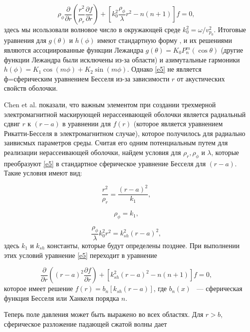 \documentclass[a4paper, 12pt]{article}
\begin{document}
 \begin{equation} \label{e5}
 	\rho_\phi \frac{\partial}{\partial r}\left(\frac{r^2}{\rho_r}
 	\frac{\partial f}{\partial r}\right) +
 	\left[ k_0^2 \frac{\rho_\phi}{\lambda} r^2 - n(n+1) \right]f =0,
 \end{equation}
 здесь мы исользовали волновое число в окружающей среде 
 $k_0^2=\omega/v^2_{p_0}$. Итоговые уравнения для $g(\theta)$ и $h(\phi)$
 имеют стандартную форму \cite{11}, и их решениями являются ассоциированные
 функции Лежандра $g(\theta)=K_0P_n^m(\cos\theta)$ (другие функции Лежандра были
 исключены из-за области) и азимутальные гармоники 
 $h(\phi)=K_1\cos (m\phi) + K_2\sin(m\phi)$. Однако \eqref{e5} не
 является ф=сферическим уравнением Бесселя из-за зависимости $r$ от
 акустических свойств оболочки.

 Chen et al. \cite{7} показали, что важным элементом при создании трехмерной
 электромагнитной маскирующей нерассеивающей оболочки является радиальный
 сдвиг $r$ к $(r-a)$ в уравнении для $f(r)$ 
 (которое является уравнением Рикатти-Бесселя в электромагнитном случае),
 которое получилось для радиально заивисмых параметров среды. Считая его
 одним потенциальным путем для реализации нерассеивающей оболочки, найдем
 условия для $\rho_r, \rho_\phi$ и $\lambda$, которые преобразуют \eqref{e5}
 в стандартное сферическое уравнение Бесселя для $(r-a)$. Такие условия
 имеют вид:

 \begin{equation}
 	\frac{r^2}{\rho_r} = \frac{(r-a)^2}{k_1},
 \end{equation}

 \begin{equation}
 	\rho_\phi=k_1,
 \end{equation}

 \begin{equation}
 	\frac{\rho_\phi}{\lambda}k_0^2r^2=k^2_{sh}(r-a)^2,
 \end{equation}
 здесь $k_1$ и $k_{sh}$ константы, которые будут определены позднее.
 При выполнении этих условий уравнение \eqref{e5} переходит в уравнение

 \begin{equation}
 	\frac{\partial}{\partial r}\left((r-a)^2 \frac{\partial f}{\partial r}\right) +
 	[k^2_{sh}(r-a)^2-n(n+1)]f = 0,
 \end{equation}
 которое имеет решение $f(r)=b_n[k_{sh}(r-a)]$, где $b_n(x)$ ~--- сферическая
 функция Бесселя или Ханкеля порядка $n$.

 Теперь поле давления может быть выражено во всех областях. Для $r>b$,
 сферическое разложение падающей сжатой волны дает
\end{document}
